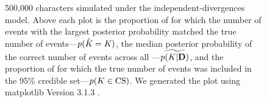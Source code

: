\begin{figure}[htbp]
\begin{center}
{        500,000 characters simulated under the independent-divergences model.
        Above each plot is
        the proportion of \datasets for which the number of events with the largest
        posterior probability matched the true number of events---$p(\hat{K_{}}
        = K_{})$,
        the median posterior probability of the correct number of events across all
        \datasets---$\widetilde{p(K_{}|\mathbf{D})}$, and
        the proportion of \datasets for which the true number of events was
        included in the 95\% credible set---$p(K_{} \in
        \textrm{CS})$.
        We generated the plot using matplotlib Version 3.1.3
        \citep{matplotlib}.
        }
        \label{fig:neventsgridbysize}
    \end{center}
\end{figure}

